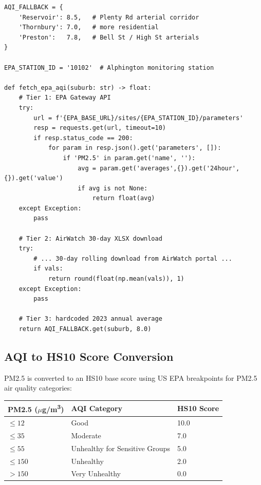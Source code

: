 \documentclass[11pt,a4paper,openany]{book}
\begin{document}
\begin{lstlisting}[style=python, caption={EPA AirWatch three-tier fallback in epa\_fetcher.py.}]
AQI_FALLBACK = {
    'Reservoir': 8.5,   # Plenty Rd arterial corridor
    'Thornbury': 7.0,   # more residential
    'Preston':   7.8,   # Bell St / High St arterials
}

EPA_STATION_ID = '10102'  # Alphington monitoring station

def fetch_epa_aqi(suburb: str) -> float:
    # Tier 1: EPA Gateway API
    try:
        url = f'{EPA_BASE_URL}/sites/{EPA_STATION_ID}/parameters'
        resp = requests.get(url, timeout=10)
        if resp.status_code == 200:
            for param in resp.json().get('parameters', []):
                if 'PM2.5' in param.get('name', ''):
                    avg = param.get('averages',{}).get('24hour',{}).get('value')
                    if avg is not None:
                        return float(avg)
    except Exception:
        pass

    # Tier 2: AirWatch 30-day XLSX download
    try:
        # ... 30-day rolling download from AirWatch portal ...
        if vals:
            return round(float(np.mean(vals)), 1)
    except Exception:
        pass

    # Tier 3: hardcoded 2023 annual average
    return AQI_FALLBACK.get(suburb, 8.0)
\end{lstlisting}

\subsection{AQI to HS10 Score Conversion}

PM2.5 is converted to an HS10 base score using US EPA breakpoints for PM2.5 air
quality categories:

\begin{center}
\begin{tabular}{C{3cm}C{3cm}C{2.5cm}}
\toprule
PM2.5 ($\mu$g/m\textsuperscript{3}) & AQI Category & HS10 Score \\
\midrule
$\leq 12$ & Good & 10.0 \\
$\leq 35$ & Moderate & 7.0 \\
$\leq 55$ & Unhealthy for Sensitive Groups & 5.0 \\
$\leq 150$ & Unhealthy & 2.0 \\
$> 150$ & Very Unhealthy & 0.0 \\
\bottomrule
\end{tabular}
\end{center}
\end{document}
